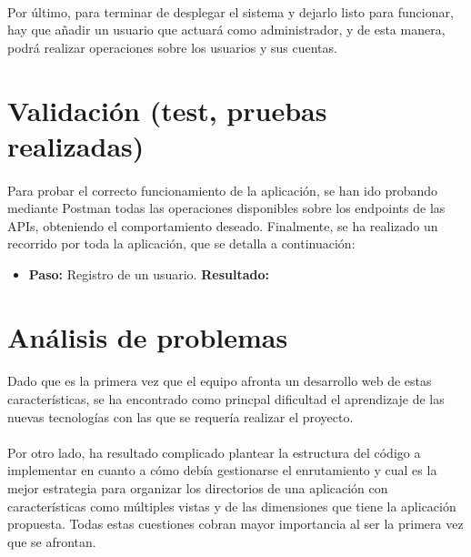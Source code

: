 \documentclass[a4paper]{article}
\begin{document}
\paragraph{}Por último, para terminar de desplegar el sistema y dejarlo listo para funcionar, hay que añadir un usuario que actuará como administrador, y de esta manera, podrá realizar operaciones sobre los usuarios y sus cuentas.

\section{Validación (test, pruebas realizadas)}
\paragraph{}Para probar el correcto funcionamiento de la aplicación, se han ido probando mediante Postman todas las operaciones disponibles sobre los endpoints de las APIs, obteniendo el comportamiento deseado. Finalmente, se ha realizado un recorrido por toda la aplicación, que se detalla a continuación:
\begin{itemize}
	\item \textbf{Paso: }Registro de un usuario. \textbf{Resultado: }
\end{itemize}

\section{Análisis de problemas}

	\paragraph{} Dado que es la primera vez que el equipo afronta un desarrollo web de estas características, se ha encontrado como princpal dificultad el aprendizaje de las nuevas tecnologías con las que se requería realizar el proyecto.
	
	\paragraph{} Por otro lado, ha resultado complicado plantear la estructura del código a implementar en cuanto a cómo debía gestionarse el enrutamiento y cual es la mejor estrategia para organizar los directorios de una aplicación con características como múltiples vistas y de las dimensiones que tiene la aplicación propuesta. Todas estas cuestiones cobran mayor importancia al ser la primera vez que se afrontan.
\end{document}
